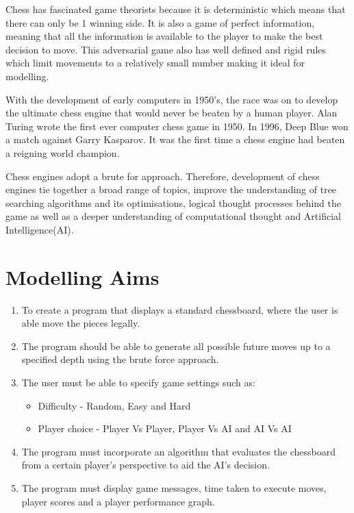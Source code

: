 \documentclass[11pt,a4paper]{article}
\begin{document}
Chess has fascinated game theorists because it is deterministic which means that there can only be 1 winning side. It is also a game of perfect information, meaning that all the information is available to the player to make the best decision to move. This adversarial game also has well defined and rigid rules which limit movements to a relatively small number making it ideal for modelling.\cite{chess1}
 
With the development of early computers in 1950’s, the race was on to develop the ultimate chess engine that would never be beaten by a human player. Alan Turing wrote the first ever computer chess game in 1950. In 1996, Deep Blue won a match against Garry Kasparov. It was the first time a chess engine had beaten a reigning world champion.
 
Chess engines adopt a brute for approach. Therefore, development of chess engines tie together a broad range of topics, improve the understanding of tree searching algorithms and its optimisations, logical thought processes behind the game as well as a deeper understanding of computational thought and Artificial Intelligence(AI).



\newpage
\section{Modelling Aims}

\begin{enumerate}
\item To create a program that displays a standard chessboard, where the user is able move the pieces legally.
\item The program should be able to generate all possible future moves up to a specified depth using the brute force approach.
\item The user must be able to specify game settings such as: 

\begin{itemize}
\item Difficulty - Random, Easy and Hard
\item Player choice - Player Vs Player, Player Vs AI and AI Vs AI
\end{itemize}

\item The program must incorporate an algorithm that evaluates the chessboard from a certain player’s perspective to aid the AI’s decision.
\item The program must display game messages, time taken to execute moves, player scores and a player performance graph.
\end{enumerate}
\end{document}
